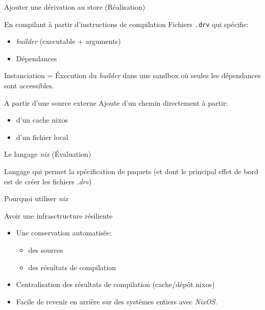 \documentclass{beamer}
\begin{document}
\begin{frame}{Ajouter une dérivation au store (Réalisation)}
\begin{block}{En compilant à partir d'instructions de compilation}
Fichiers \texttt{.drv} qui spécifie:
\begin{itemize}
	\item \emph{builder} (executable + arguments)
	\item Dépendances
\end{itemize}

Instanciation = \'Execution du \emph{builder} dans une sandbox où seules les dépendances sont accessibles.

\end{block}

\begin{block}{A partir d'une source externe}
Ajoute d'un chemin directement à partir:
\begin{itemize}
	\item d'un cache nixos
	\item d'un fichier local
	\end{itemize}
\end{block}

\end{frame}

\begin{frame}{Le langage \emph{nix} (\'Evaluation)}

	Langage qui permet la spécification de paquets (et dont le principal effet de bord est de créer les fichiers \emph{.drv})

\end{frame}

\begin{frame}{Pourquoi utiliser \emph{nix}}

Avoir une infrasctructure résiliente

\begin{itemize}
	\item Une conservation automatisée:
		\begin{itemize}
			\item des sources
			\item des résultats de compilation
		\end{itemize}
	\item Centralisation des résultats de compilation (cache/dépôt nixos)
	\item Facile de revenir en arrière sur des systèmes entiers avec \emph{NixOS}.
\end{itemize}
\end{frame}
\end{document}
